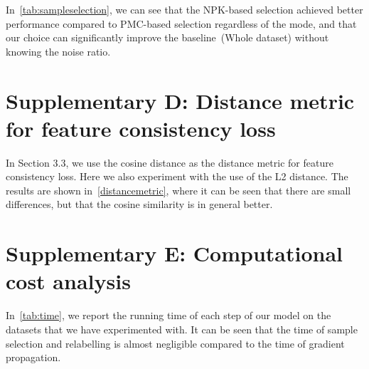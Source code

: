 \documentclass{bmvc2k}
\begin{document}
In~\cref{tab:sampleselection}, we can see that the NPK-based selection achieved better performance compared to PMC-based selection regardless of the mode, and that our choice can significantly improve the baseline~(Whole dataset) without knowing the noise ratio. 

\section*{Supplementary D: Distance metric for feature consistency loss}
\label{sup:d}
In Section 3.3, we use the cosine distance as the distance metric for feature consistency loss. Here we also experiment with the use of the L2 distance. The results are shown in~\cref{distancemetric}, where it can be seen that there are small differences, but that the cosine similarity is in general better.

\begin{table}[htbp]
\begin{center}
\end{center}
\caption{SSR+ with different distance metric for feature consistency loss}
\label{distancemetric}
\end{table}

\section*{Supplementary E: Computational cost analysis}
\label{sup:e}
In~\cref{tab:time}, we report the running time of each step of our model on the datasets that we have experimented with. It can be seen that the time of sample selection and relabelling is almost negligible compared to the time of gradient propagation.
\end{document}
